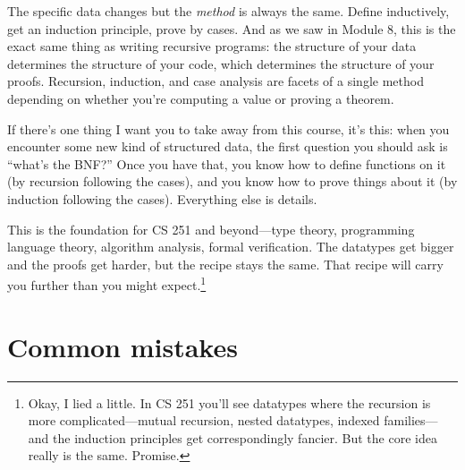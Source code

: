 \documentclass[11pt]{article}
\begin{document}
The specific data changes but the \emph{method} is always the same. Define inductively, get an induction principle, prove by cases. And as we saw in Module 8, this is the exact same thing as writing recursive programs: the structure of your data determines the structure of your code, which determines the structure of your proofs. Recursion, induction, and case analysis are facets of a single method depending on whether you're computing a value or proving a theorem.

If there's one thing I want you to take away from this course, it's this: when you encounter some new kind of structured data, the first question you should ask is ``what's the BNF?'' Once you have that, you know how to define functions on it (by recursion following the cases), and you know how to prove things about it (by induction following the cases). Everything else is details.

This is the foundation for CS 251 and beyond---type theory, programming language theory, algorithm analysis, formal verification. The datatypes get bigger and the proofs get harder, but the recipe stays the same. That recipe will carry you further than you might expect.\footnote{Okay, I lied a little. In CS 251 you'll see datatypes where the recursion is more complicated---mutual recursion, nested datatypes, indexed families---and the induction principles get correspondingly fancier. But the core idea really is the same. Promise.}

\section{Common mistakes}
\end{document}
